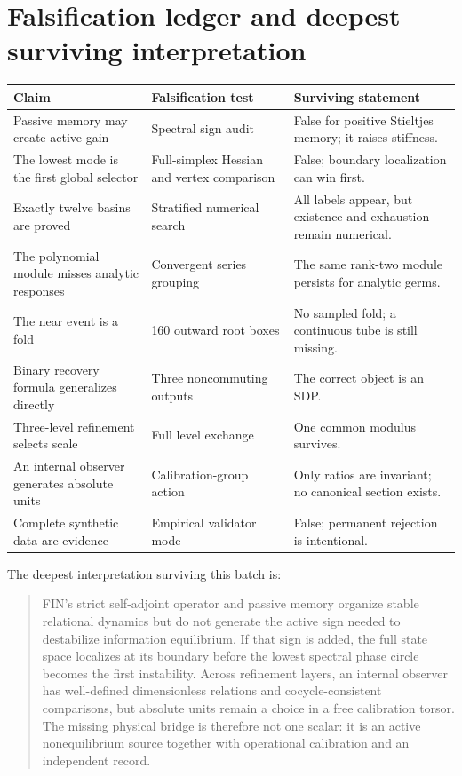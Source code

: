 \documentclass[11pt,a4paper]{article}
\begin{document}
\section{Falsification ledger and deepest surviving interpretation}
\begin{longtable}{p{}p{}p{}}
\toprule Claim&Falsification test&Surviving statement\\\midrule\endhead
Passive memory may create active gain&Spectral sign audit&False for positive Stieltjes memory; it raises stiffness.\\
The lowest mode is the first global selector&Full-simplex Hessian and vertex comparison&False; boundary localization can win first.\\
Exactly twelve basins are proved&Stratified numerical search&All labels appear, but existence and exhaustion remain numerical.\\
The polynomial module misses analytic responses&Convergent series grouping&The same rank-two module persists for analytic germs.\\
The near event is a fold&160 outward root boxes&No sampled fold; a continuous tube is still missing.\\
Binary recovery formula generalizes directly&Three noncommuting outputs&The correct object is an SDP.\\
Three-level refinement selects scale&Full level exchange&One common modulus survives.\\
An internal observer generates absolute units&Calibration-group action&Only ratios are invariant; no canonical section exists.\\
Complete synthetic data are evidence&Empirical validator mode&False; permanent rejection is intentional.\\
\bottomrule\end{longtable}

The deepest interpretation surviving this batch is:
\begin{quote}
FIN's strict self-adjoint operator and passive memory organize stable relational dynamics but
do not generate the active sign needed to destabilize information equilibrium. If that sign
is added, the full state space localizes at its boundary before the lowest spectral phase
circle becomes the first instability. Across refinement layers, an internal observer has
well-defined dimensionless relations and cocycle-consistent comparisons, but absolute units
remain a choice in a free calibration torsor. The missing physical bridge is therefore not
one scalar: it is an active nonequilibrium source together with operational calibration and
an independent record.
\end{quote}
\end{document}
